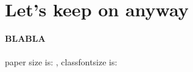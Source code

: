 \chapter{Let's keep on anyway}

\textbf{\color{red} BLABLA}
\\\\
paper size is: \papersize,  classfontsize is: \classfontsize